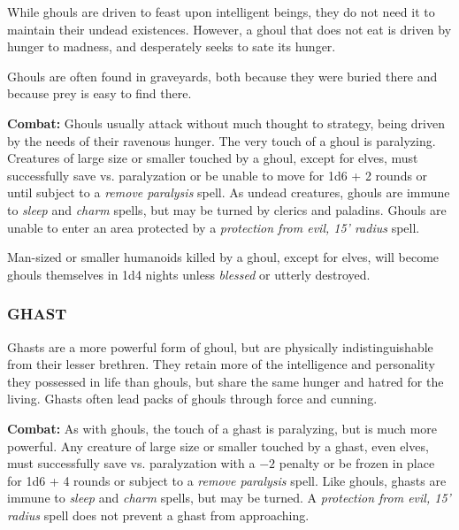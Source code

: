 \begin{multicols}{2}
While ghouls are driven to feast upon intelligent beings, they do not need it to maintain their undead existences. However, a ghoul that does not eat is driven by hunger to madness, and desperately seeks to sate its hunger.

Ghouls are often found in graveyards, both because they were buried there and because prey is easy to find there.

\textbf{Combat:} Ghouls usually attack without much thought to strategy, being driven by the needs of their ravenous hunger. The very touch of a ghoul is paralyzing. Creatures of large size or smaller touched by a ghoul, except for elves, must successfully save vs. paralyzation or be unable to move for 1d6 + 2 rounds or until subject to a \textit{remove paralysis} spell. As undead creatures, ghouls are immune to \textit{sleep} and \textit{charm} spells, but may be turned by clerics and paladins. Ghouls are unable to enter an area protected by a \textit{protection from evil, 15' radius} spell.

Man-sized or smaller humanoids killed by a ghoul, except for elves, will become ghouls themselves in 1d4 nights unless \textit{blessed} or utterly destroyed.

\subsubsection{GHAST}

Ghasts are a more powerful form of ghoul, but are physically indistinguishable from their lesser brethren. They retain more of the intelligence and personality they possessed in life than ghouls, but share the same hunger and hatred for the living. Ghasts often lead packs of ghouls through force and cunning.

\textbf{Combat:} As with ghouls, the touch of a ghast is paralyzing, but is much more powerful. Any creature of large size or smaller touched by a ghast, even elves, must successfully save vs. paralyzation with a $-2$ penalty or be frozen in place for 1d6 + 4 rounds or subject to a \textit{remove paralysis} spell. Like ghouls, ghasts are immune to \textit{sleep} and \textit{charm} spells, but may be turned. A \textit{protection from evil, 15' radius} spell does not prevent a ghast from approaching.

\end{multicols}

